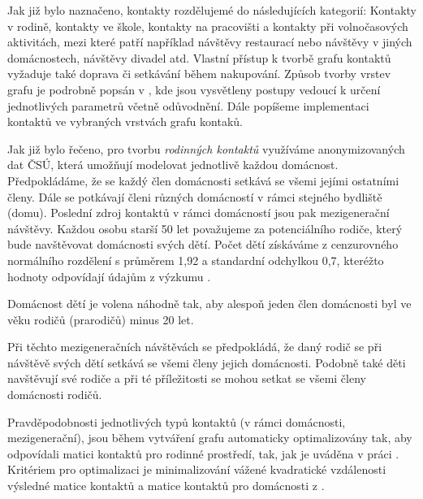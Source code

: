Jak již bylo naznačeno, kontakty rozdělujemé do následujících kategorií: Kontakty v rodině, kontakty ve škole, kontakty na pracovišti a kontakty při volnočasových aktivitách, mezi které patří například návštěvy restaurací nebo návštěvy v jiných domácnostech, návštěvy divadel atd. Vlastní přístup k tvorbě grafu kontaktů vyžaduje také doprava či setkávání během nakupování. Způsob tvorby vrstev grafu je podrobně popsán v \cite{pg:modelM}, kde jsou vysvětleny postupy vedoucí k určení jednotlivých parametrů včetně odůvodnění. Dále popíšeme implementaci kontaktů ve vybraných vrstvách grafu kontaků.

Jak již bylo řečeno, pro tvorbu \emph{rodinných kontaktů} využíváme anonymizovaných dat ČSÚ, která umožňují modelovat jednotlivě každou domácnost. Předpokládáme, že se každý člen domácnosti setkává se všemi jejími ostatními členy. Dále se potkávají členi různých domácností v rámci stejného bydliště (domu). Poslední zdroj kontaktů v rámci domácností jsou pak mezigenerační návštěvy.
Každou osobu starší 50 let považujeme za potenciálního rodiče, který bude navštěvovat domácnosti svých dětí. Počet dětí získáváme z cenzurovného normálního rozdělení s průměrem 1,92 a standardní odchylkou 0,7, kteréžto hodnoty odpovídají údajům z výzkumu \cite{zaj:ess}.

Domácnost dětí je volena náhodně tak, aby alespoň jeden člen domácnosti byl ve věku rodičů (prarodičů) minus 20 let.

Při těchto mezigeneračních návštěvách se předpokládá, že daný rodič se při návštěvě svých dětí setkává se všemi členy jejich domácnosti. Podobně také děti navštěvují své rodiče a při té příležitosti se mohou setkat se všemi členy domácnosti rodičů.

Pravděpodobnosti jednotlivých typů kontaktů (v rámci domácnosti, mezigenerační), jsou během vytváření grafu automaticky optimalizovány tak, aby odpovídali matici kontaktů pro rodinné prostředí, tak, jak je uváděna v práci \cite{Prem_etal2017}. Kritériem pro optimalizaci je 
minimalizování vážené kvadratické vzdálenosti výsledné matice kontaktů a matice kontaktů pro domácnosti z \cite{Prem_etal2017}.


